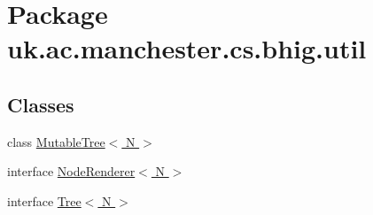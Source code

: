 \hypertarget{namespaceuk_1_1ac_1_1manchester_1_1cs_1_1bhig_1_1util}{\section{Package uk.\-ac.\-manchester.\-cs.\-bhig.\-util}
\label{namespaceuk_1_1ac_1_1manchester_1_1cs_1_1bhig_1_1util}
}
\subsection*{Classes}
\begin{DoxyCompactItemize}
\item 
class \hyperlink{classuk_1_1ac_1_1manchester_1_1cs_1_1bhig_1_1util_1_1_mutable_tree_3_01_n_01_4}{Mutable\-Tree$<$ N $>$}
\item 
interface \hyperlink{interfaceuk_1_1ac_1_1manchester_1_1cs_1_1bhig_1_1util_1_1_node_renderer_3_01_n_01_4}{Node\-Renderer$<$ N $>$}
\item 
interface \hyperlink{interfaceuk_1_1ac_1_1manchester_1_1cs_1_1bhig_1_1util_1_1_tree_3_01_n_01_4}{Tree$<$ N $>$}
\end{DoxyCompactItemize}
